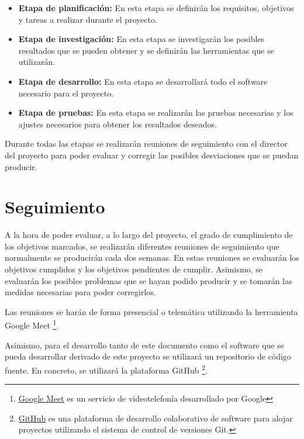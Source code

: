 \begin{itemize}
    \item \textbf{Etapa de planificación:} En esta etapa se definirán los requisitos, 
    objetivos y tareas a realizar durante el proyecto.
    \item \textbf{Etapa de investigación:} En esta etapa se investigarán los posibles 
    resultados que se pueden obtener y se definirán las herramientas que se utilizarán.
    \item \textbf{Etapa de desarrollo:} En esta etapa se desarrollará todo el software 
    necesario para el proyecto.
    \item \textbf{Etapa de pruebas:} En esta etapa se realizarán las pruebas necesarias y los 
    ajustes necesarios para obtener los resultados deseados.
\end{itemize}

Durante todas las etapas se realizarán reuniones de seguimiento con el director del proyecto para
poder evaluar y corregir las posibles desviaciones que se puedan producir.

\section{Seguimiento}
\label{sec:metodologia:seguimiento}


A la hora de poder evaluar, a lo largo del proyecto, el grado de cumplimiento de los objetivos
marcados, se realizarán diferentes reuniones de seguimiento que normalmente se producirán cada
dos semanas. En estas reuniones se evaluarán los objetivos cumplidos y los objetivos pendientes
de cumplir. Asimismo, se evaluarán los posibles problemas que se hayan podido producir y se
tomarán las medidas necesarias para poder corregirlos.

Las reuniones se harán de forma presencial o telemática utilizando la herramienta Google Meet
\footnote{\href{https://meet.google.com/}{Google Meet} es un servicio de videotelefonía desarrollado por Google}.

Asimismo, para el desarrollo tanto de este documento como el software que se pueda desarrollar derivado
de este proyecto se utilizará un repositorio de código fuente. En concreto, se utilizará la plataforma
GitHub \footnote{\href{https://github.com/}{GitHub} es una plataforma de desarrollo colaborativo de software
para alojar proyectos utilizando el sistema de control de versiones Git.}.

